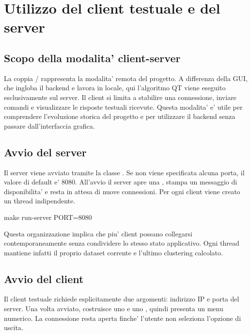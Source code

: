 \chapter{Utilizzo del client testuale e del server}
\label{chap:client-server}

\section{Scopo della modalita' client-server}

La coppia / rappresenta la modalita' remota del
progetto. A differenza della GUI, che ingloba il backend e lavora in locale, qui
l'algoritmo QT viene eseguito esclusivamente sul server. Il client si limita a stabilire
una connessione, inviare comandi e visualizzare le risposte testuali ricevute. Questa
modalita' e' utile per comprendere l'evoluzione storica del progetto e per utilizzare il
backend senza passare dall'interfaccia grafica.

\section{Avvio del server}

Il server viene avviato tramite la classe . Se non viene
specificata alcuna porta, il valore di default e' 8080. All'avvio il server apre una
, stampa un messaggio di disponibilita' e resta in attesa di nuove
connessioni. Per ogni client viene creato un thread  indipendente.

\begin{commandblock}
  make run-server PORT=8080
\end{commandblock}

Questa organizzazione implica che piu' client possano collegarsi contemporaneamente senza
condividere lo stesso stato applicativo. Ogni thread mantiene infatti il proprio dataset
corrente e l'ultimo clustering calcolato.

\section{Avvio del client}

Il client testuale richiede esplicitamente due argomenti: indirizzo IP e porta del
server. Una volta avviato, costruisce uno  e uno
, quindi presenta un menu numerico. La connessione resta aperta
finche' l'utente non seleziona l'opzione di uscita.

